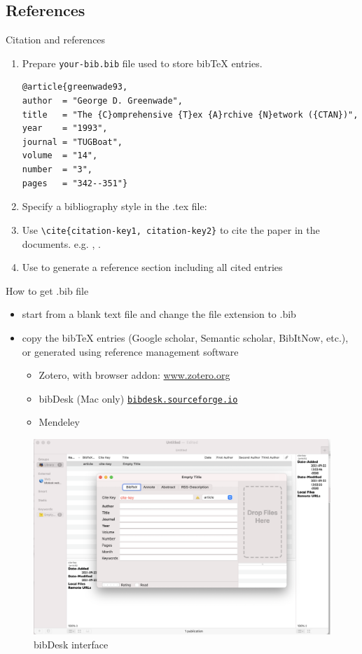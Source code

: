 \documentclass [xcolor=svgnames, t] {beamer}
\begin{document}
\subsection{References}
\begin{frame}[fragile]{Citation and references}
    \begin{enumerate}
        \item Prepare \verb|your-bib.bib| file used to store bibTeX entries.
        \begin{lstlisting}
@article{greenwade93,
author  = "George D. Greenwade",
title   = "The {C}omprehensive {T}ex {A}rchive {N}etwork ({CTAN})",    year    = "1993",
journal = "TUGBoat",
volume  = "14",
number  = "3",
pages   = "342--351"}\end{lstlisting}
        \item Specify a bibliography style in the .tex file: \verb||
        \item Use \verb|\cite{citation-key1, citation-key2}| to cite the paper in the documents. e.g. \cite{greenwade93}, \cite{AFCIP,ITDS}.
        \item Use \verb|| to generate a reference section including all cited entries
    \end{enumerate}
\end{frame}

\begin{frame}[fragile]{How to get .bib file}
    \begin{itemize}
        \item start from a blank text file and change the file extension to .bib
        \item copy the bibTeX entries (Google scholar, Semantic scholar, BibItNow, etc.), or generated using reference management software
        \begin{itemize}
            \item Zotero, with browser addon: \url{www.zotero.org}
            \item bibDesk (Mac only) \href{bibdesk.sourceforge.io}{\texttt{bibdesk.sourceforge.io}}
            \item Mendeley
        \end{itemize}
    \end{itemize}
    \begin{figure}
        \centering
        \includegraphics[width = 0.4 \textwidth]{figures/BibDesk.png}
        \caption{bibDesk interface}
    \end{figure}
\end{frame}
\end{document}
